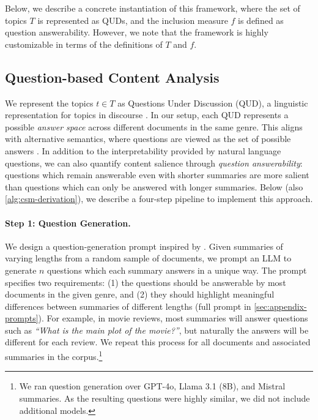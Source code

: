 Below, we describe a concrete instantiation of this framework, where the set of topics $T$ is represented as QUDs, and the inclusion measure $f$ is defined as question answerability.
However, we note that the framework is highly customizable
in terms of the definitions of $T$ and $f$.

\subsection{Question-based Content Analysis}
\label{sec:method-questions}
We represent the topics $t \in T$ as Questions Under Discussion (QUD), a linguistic representation for topics in discourse \cite{Van:1995:discourse}.
In our setup, each QUD represents a possible \emph{answer space} across different documents in the same genre. This aligns with alternative semantics, where questions are viewed as the set of possible answers \cite{Hamblin:1973:Questions,Karttunen:1977:syntax,Groenendijk:1984:studies}.
In addition to the interpretability provided by natural language questions,
we can also quantify content salience through \emph{question answerability}:
questions which remain answerable even with shorter summaries are more salient than questions which can only be answered with longer summaries.
Below (also \cref{alg:csm-derivation}), we describe a four-step pipeline to implement this approach.



\paragraph{Step 1: Question Generation.}
We design a question-generation prompt inspired by \cite{Laban:2022:Findings}.
Given summaries of varying lengths from a random sample of documents, we prompt an
LLM to generate $n$ questions which each summary answers in a unique way.
The prompt specifies two requirements: (1) the questions should be answerable by most documents in the given genre, and (2) they should highlight meaningful differences between summaries of different lengths (full prompt in \cref{sec:appendix-prompts}).
For example, in movie reviews, most summaries will answer questions such as \emph{``What is the main plot of the movie?''}, but naturally the answers will be different for each review.
We repeat this process for all documents and associated summaries in the corpus.\footnote{
    We ran question generation over GPT-4o, Llama 3.1 (8B), and Mistral summaries. As the resulting questions were highly similar, we did not include additional models.
}

